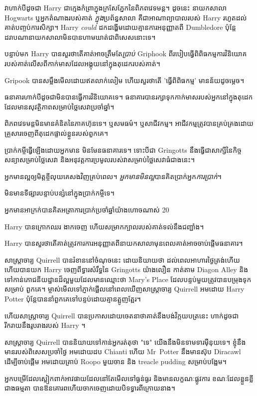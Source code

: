 {{{វាហាក់បីដូចជា Harry ជាក្មេងកំព្រាក្នុងក្រសែភ្នែកនៃពិភពវេទមន្ត។ ដូចនេះ នាយកសាលា Hogwarts ឬអ្នកតំណាងរបស់គាត់ \emph{ក្នុង}ប្រព័ន្ធសាលា គឺជាអាណាព្យាបាលរបស់ Harry រហូតដល់គាត់បញ្ចប់ការសិក្សា។ Harry \emph{could} ដកដង្ហើមដោយគ្មានការអនុញ្ញាតពី Dumbledore ប៉ុន្តែដរាបណានាយកសាលាមិនបានហាមឃាត់ជាពិសេសនោះទេ។

បន្ទាប់មក Harry បានសួរថាតើគាត់អាចត្រឹមតែ\emph{ប្រាប់} Griphook ពីរបៀបធ្វើពិពិធកម្មការវិនិយោគរបស់គាត់លើសពីកាក់មាសដែលអង្គុយនៅក្នុងតុដេករបស់គាត់។

Gripook បានសម្លឹងមើលដោយឥតលាក់លៀម ហើយសួរថាតើ 'ធ្វើពិពិធកម្ម' មានន័យដូចម្តេច។

ធនាគារហាក់បីដូចជាមិនបានធ្វើការវិនិយោគទេ។ ធនាគារបានរក្សាទុកកាក់មាសរបស់អ្នកនៅក្នុងតុដេកដែលមានសុវត្ថិភាពសម្រាប់ថ្លៃសេវាប្រចាំឆ្នាំ។

ពិភពវេទមន្តមិនមានគំនិតនៃភាគហ៊ុនទេ។ ឬសមធម៌។ ឬសាជីវកម្ម។ អាជីវកម្មត្រូវបានគ្រប់គ្រងដោយគ្រួសារចេញពីតុដេកផ្ទាល់ខ្លួនរបស់ពួកគេ។

ប្រាក់កម្ចីធ្វើឡើងដោយអ្នកមាន មិនមែនធនាគារទេ។ ទោះបីជា Gringotts នឹងធ្វើជាសាក្សីនៃកិច្ចសន្យាសម្រាប់ថ្លៃសេវា និងអនុវត្តការប្រមូលរបស់វាសម្រាប់ថ្លៃសេវាធំជាងនេះ។

អ្នក​មាន​ល្អ​ឲ្យ​មិត្ត​ខ្ចី​លុយ​គេ​សង​វិញ​គ្រប់​ពេល។ \emph{អ្នកមានមិនល្អ}បានគិតប្រាក់អ្នក\emph{ការប្រាក់}។

មិនមានទីផ្សារបន្ទាប់បន្សំនៅក្នុងប្រាក់កម្ចីទេ។

អ្នកមានអាក្រក់បានគិតអត្រាការប្រាក់ប្រចាំឆ្នាំយ៉ាងហោចណាស់ 20%

Harry បានក្រោកឈរ ងាកចេញ ហើយសម្រាកក្បាលរបស់គាត់ទល់នឹងជញ្ជាំង។

Harry បានសួរថាតើគាត់ត្រូវការការអនុញ្ញាតពីនាយកសាលាមុនពេលគាត់អាចចាប់ផ្តើមធនាគារ។

សាស្ត្រាចារ្យ Quirrell បានរំខាននៅចំណុចនេះ ដោយនិយាយថា ដល់ពេលអាហារថ្ងៃត្រង់ហើយ ហើយបានយក Harry ចេញពីទ្វារសំរឹទ្ធនៃ Gringotts យ៉ាងលឿន កាត់តាម Diagon Alley និងទៅកាន់ភោជនីយដ្ឋានដ៏ល្អមួយដែលមានឈ្មោះថា Mary's Place ដែលបន្ទប់មួយត្រូវបានបម្រុងទុកសម្រាប់ ពួកគេ។ ម្ចាស់មើលទៅភ្ញាក់ផ្អើលនៅពេលឃើញសាស្រ្តាចារ្យ Quirrell អមដោយ Harry Potter ប៉ុន្តែបាននាំពួកគេទៅបន្ទប់ដោយគ្មានត្អូញត្អែរ។

ហើយសាស្រ្តាចារ្យ Quirrell បានប្រកាសដោយចេតនាថាគាត់នឹងបង់វិក្កយបត្រនេះ ហាក់ដូចជារីករាយនឹងរូបរាងរបស់ Harry ។

សាស្រ្តាចារ្យ Quirrell បាននិយាយទៅកាន់អ្នករត់តុថា "ទេ" យើងនឹងមិនទាមទារម៉ឺនុយទេ។ ខ្ញុំនឹងមានរបស់ពិសេសប្រចាំថ្ងៃ អមដោយដប Chianti ហើយ Mr~Potter នឹងមានស៊ុប Diracawl ដើម្បីចាប់ផ្តើម អមដោយគ្រាប់ Roopo មួយចាន និង treacle pudding សម្រាប់បង្អែម។

អ្នកបម្រើដែលស្លៀកពាក់អាវផាយដែលនៅតែមើលទៅធ្ងន់ធ្ងរ និងមានលក្ខណៈផ្លូវការ ខណៈដែលខ្លួនខ្លីជាងធម្មតា បានឱនគោរពហើយចាកចេញដោយបិទទ្វារពីក្រោយនាង។

}}}
